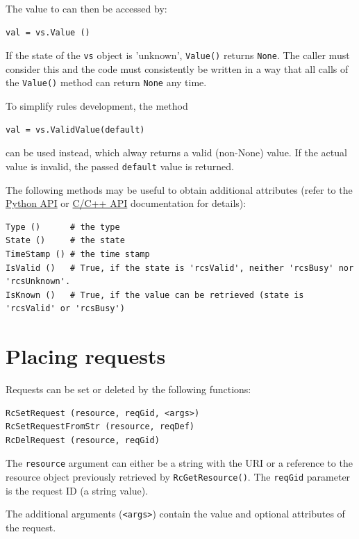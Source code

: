 \documentclass[12pt,english,parskip=half]{scrreprt}
\newcommand{\projecturl}{}
\newcommand{\docref}[2]{\href{\projecturl#1}{#2}}
\newcommand{\refapipython}{\docref{home2l-api_python/index.html}{Python API}}
\newcommand{\refapic}{\docref{home2l-api_c/index.html}{C/C++ API}}
\begin{document}
The value to can then be accessed by:

\begin{lstlisting}
val = vs.Value ()
\end{lstlisting}

If the state of the \texttt{vs} object is 'unknown',
\texttt{Value()} returns \texttt{None}. The caller must consider
this and the code must consistently be written in a way that all calls
of the \texttt{Value()} method can return \texttt{None} any time.

To simplify rules development, the method

\begin{lstlisting}
val = vs.ValidValue(default)
\end{lstlisting}

can be used instead, which alway returns a valid (non-None) value. If the actual value
is invalid, the passed \texttt{default} value is returned.

The following methods may be useful to obtain additional attributes
(refer to the \refapipython{} or \refapic{} documentation for details):

\begin{lstlisting}
Type ()      # the type
State ()     # the state
TimeStamp () # the time stamp
IsValid ()   # True, if the state is 'rcsValid', neither 'rcsBusy' nor 'rcsUnknown'.
IsKnown ()   # True, if the value can be retrieved (state is 'rcsValid' or 'rcsBusy')
\end{lstlisting}

\section{Placing requests}
\label{sec:rules-requests}

Requests can be set or deleted by the following functions:

\begin{lstlisting}
RcSetRequest (resource, reqGid, <args>)
RcSetRequestFromStr (resource, reqDef)
RcDelRequest (resource, reqGid)
\end{lstlisting}

The \texttt{resource} argument can either be a string with the URI or
a reference to the resource object previously retrieved by
\texttt{RcGetResource()}. The \texttt{reqGid} parameter is the
request ID (a string value).

The additional arguments (\texttt{<args>}) contain the value and
optional attributes of the request.
\end{document}
